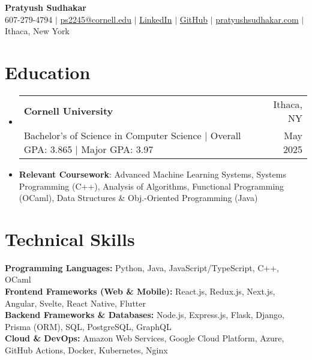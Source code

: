 \documentclass[letterpaper,11pt]{article}
\makeatletter
\newcommand{\resumeItem}[1]{
  \item\small{
    {#1}
  }
}
\newcommand{\education}[4]{
  \vspace{-2pt}\item
    \begin{tabular*}{0.985\textwidth}[t]{@{}l@{\extracolsep{\fill}}r@{}}
      \textbf{#1} & #2 \\
      #3 & #4 \\
    \end{tabular*}\vspace{-6pt}
}
\newcommand{\resumeSubHeadingListStart}{\begin{itemize}[leftmargin=0.04in, label={}]}
\newcommand{\resumeSubHeadingListEnd}{\end{itemize}\vspace{-4pt}}
\makeatother
\begin{document}
\begin{center}
  \vspace*{-1.25cm}
  \textbf{\huge  Pratyush Sudhakar} \\ \vspace{4pt}
   607-279-4794 $|$ \href{mailto:ps2245@cornell.edu}{ps2245@cornell.edu} $|$
  \href{https://linkedin.com/in/pratyushsudhakar}{LinkedIn} $|$
  \href{https://github.com/pratyush1712}{GitHub} $|$
  \href{https://pratyushsudhakar.com/}{pratyushsudhakar.com}
  $|$
  {Ithaca, New York}
\end{center}


\vspace{-8pt}
\section{Education}
\resumeSubHeadingListStart
\education
{Cornell University}{Ithaca, NY}
{Bachelor's of Science in Computer Science $|$ Overall GPA: 3.865 $|$ Major GPA: 3.97}{May 2025}

\resumeItem{\textbf{Relevant Coursework}: Advanced Machine Learning Systems, Systems Programming (C++), Analysis of Algorithms, Functional Programming (OCaml), Data Structures \& Obj.-Oriented Programming (Java)}
\resumeSubHeadingListEnd

\vspace{-10.5pt}
\section{Technical Skills}
\resumeSubHeadingListStart
\small{\item{
    \textbf{Programming Languages:} Python, Java, JavaScript/TypeScript, C++, OCaml \\
    \vspace{2pt}
    \textbf{Frontend Frameworks (Web \& Mobile):} React.js, Redux.js, Next.js, Angular, Svelte, React Native, Flutter \\
    \vspace{2pt}
    \textbf{Backend Frameworks \& Databases:} Node.js, Express.js, Flask, Django, Prisma (ORM), SQL, PostgreSQL, GraphQL \\
    \vspace{2pt}
    \textbf{Cloud \& DevOps:} Amazon Web Services, Google Cloud Platform, Azure, GitHub Actions, Docker, Kubernetes, Nginx
}}
\resumeSubHeadingListEnd

\vspace{-10.5pt}
\end{document}
